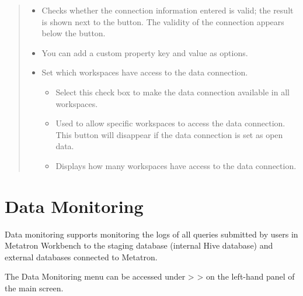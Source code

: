 \documentclass[letterpaper,10pt,english]{sphinxmanual}
\begin{document}
\begin{quote}
\begin{itemize}
\begin{itemize}
\end{itemize}

\item {} 
 Checks whether the connection information entered is valid; the result is shown next to the button. The validity of the connection appears below the button.

\item {} 
 You can add a custom property key and value as options.

\item {} 
 Set which workspaces have access to the data connection.
\begin{itemize}
\item {} 
 Select this check box to make the data connection available in all workspaces.

\item {} 
 Used to allow specific workspaces to access the data connection. This button will disappear if the data connection is set as open data.

\item {} 
 Displays how many workspaces have access to the data connection.

\end{itemize}

\end{itemize}
\end{quote}


\section{Data Monitoring}
\label{\detokenize{discovery/part02/data_monitoring:id1}}\label{\detokenize{discovery/part02/data_monitoring::doc}}
Data monitoring supports monitoring the logs of all queries submitted by users in Metatron Workbench to the staging database (internal Hive database) and external databases connected to Metatron.

The Data Monitoring menu can be accessed under  \textgreater{}  \textgreater{}  on the left-hand panel of the main screen.
\begin{quote}

\begin{figure}[H]
\centering

\noindent{}
\end{figure}
\end{quote}
\end{document}
